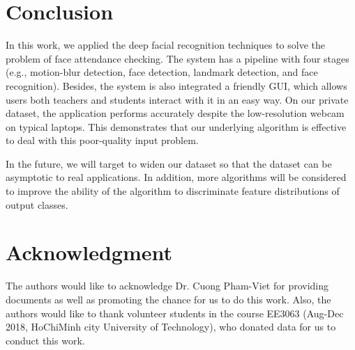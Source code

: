 \documentclass[journal, twocolumn]{IEEEtran}
\begin{document}
\section{Conclusion}
\label{conclusion}

In this work, we applied the deep facial recognition techniques to solve the problem of face attendance checking. The system has a pipeline with four stages (e.g., motion-blur detection, face detection, landmark detection, and face recognition). Besides, the system is also integrated a friendly GUI, which allows users both teachers and students interact with it in an easy way. On our private dataset, the application performs accurately despite the low-resolution webcam on typical laptops. This demonstrates that our underlying algorithm is effective to deal with this poor-quality input problem.

In the future, we will target to widen our dataset so that the dataset can be asymptotic to real applications. In addition, more algorithms will be considered to improve the ability of the algorithm to discriminate feature distributions of output classes.


\section*{Acknowledgment}

The authors would like to acknowledge Dr. Cuong Pham-Viet for providing documents as well as promoting the chance for us to do this work. Also, the authors would like to thank volunteer students in the course EE3063 (Aug-Dec 2018, HoChiMinh city University of Technology), who donated data for us to conduct this work.


\begin{thebibliography}{9}

\end{thebibliography}
\end{document}
